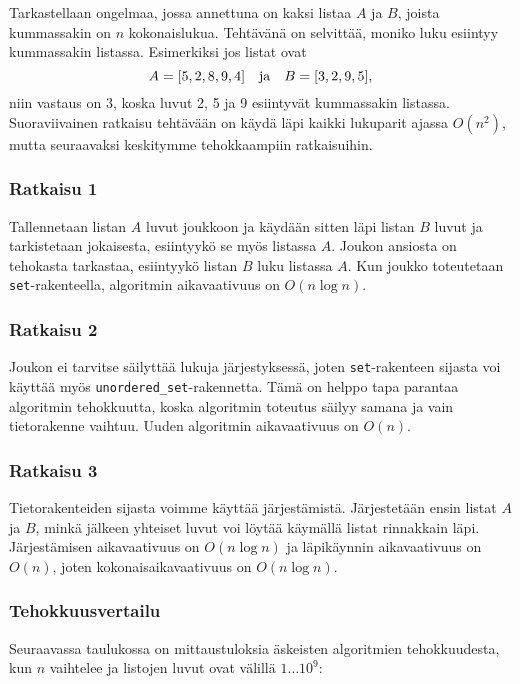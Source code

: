 Tarkastellaan ongelmaa, jossa
annettuna on kaksi listaa $A$ ja $B$,
joista kummassakin on $n$ kokonaislukua.
Tehtävänä on selvittää, moniko luku
esiintyy kummassakin listassa.
Esimerkiksi jos listat ovat
\[A = [5,2,8,9,4] \hspace{10px} \textrm{ja} \hspace{10px} B = [3,2,9,5],\]
niin vastaus on 3, koska luvut 2, 5
ja 9 esiintyvät kummassakin listassa.
Suoraviivainen ratkaisu tehtävään on käydä läpi
kaikki lukuparit ajassa $O(n^2)$, mutta seuraavaksi
keskitymme tehokkaampiin ratkaisuihin.

\subsubsection{Ratkaisu 1}

Tallennetaan listan $A$ luvut joukkoon
ja käydään sitten läpi listan $B$ luvut ja
tarkistetaan jokaisesta, esiintyykö se myös listassa $A$.
Joukon ansiosta on tehokasta tarkastaa,
esiintyykö listan $B$ luku listassa $A$.
Kun joukko toteutetaan \texttt{set}-rakenteella,
algoritmin aikavaativuus on $O(n \log n)$.

\subsubsection{Ratkaisu 2}

Joukon ei tarvitse säilyttää lukuja
järjestyksessä, joten
\texttt{set}-ra\-ken\-teen sijasta voi
käyttää myös \texttt{unordered\_set}-ra\-ken\-net\-ta.
Tämä on helppo tapa parantaa algoritmin
tehokkuutta, koska
algoritmin toteutus säilyy samana ja vain tietorakenne vaihtuu.
Uuden algoritmin aikavaativuus on $O(n)$.

\subsubsection{Ratkaisu 3}

Tietorakenteiden sijasta voimme käyttää järjestämistä.
Järjestetään ensin listat $A$ ja $B$,
minkä jälkeen yhteiset luvut voi löytää
käymällä listat rinnakkain läpi.
Järjestämisen aikavaativuus on $O(n \log n)$ ja
läpikäynnin aikavaativuus on $O(n)$,
joten kokonaisaikavaativuus on $O(n \log n)$.

\subsubsection{Tehokkuusvertailu}

Seuraavassa taulukossa on mittaustuloksia
äskeisten algoritmien tehokkuudesta,
kun $n$ vaihtelee ja listojen luvut ovat välillä $1 \ldots 10^9$:

